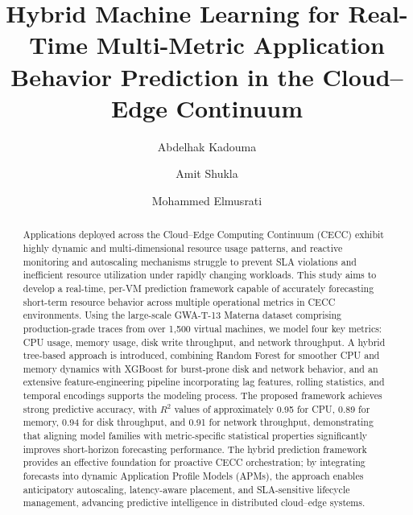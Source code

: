 \documentclass[a4paper,fleqn]{cas-dc}
\begin{document}
\let\WriteBookmarks\relax
\def\floatpagepagefraction{1}
\def\textpagefraction{.001}


\title[mode=title]{Hybrid Machine Learning for Real-Time Multi-Metric Application Behavior Prediction in the Cloud--Edge Continuum}

\author[1]{Abdelhak Kadouma}
\cormark[1]

\author[1]{Amit Shukla}

\author[1]{Mohammed Elmusrati}



\begin{abstract}
Applications deployed across the Cloud--Edge Computing Continuum (CECC) exhibit highly dynamic and multi-dimensional resource usage patterns, and reactive monitoring and autoscaling mechanisms struggle to prevent SLA violations and inefficient resource utilization under rapidly changing workloads. This study aims to develop a real-time, per-VM prediction framework capable of accurately forecasting short-term resource behavior across multiple operational metrics in CECC environments. Using the large-scale GWA-T-13 Materna dataset comprising production-grade traces from over 1,500 virtual machines, we model four key metrics: CPU usage, memory usage, disk write throughput, and network throughput. A hybrid tree-based approach is introduced, combining Random Forest for smoother CPU and memory dynamics with XGBoost for burst-prone disk and network behavior, and an extensive feature-engineering pipeline incorporating lag features, rolling statistics, and temporal encodings supports the modeling process. The proposed framework achieves strong predictive accuracy, with $R^2$ values of approximately 0.95 for CPU, 0.89 for memory, 0.94 for disk throughput, and 0.91 for network throughput, demonstrating that aligning model families with metric-specific statistical properties significantly improves short-horizon forecasting performance. The hybrid prediction framework provides an effective foundation for proactive CECC orchestration; by integrating forecasts into dynamic Application Profile Models (APMs), the approach enables anticipatory autoscaling, latency-aware placement, and SLA-sensitive lifecycle management, advancing predictive intelligence in distributed cloud--edge systems.
\end{abstract}
\end{document}
